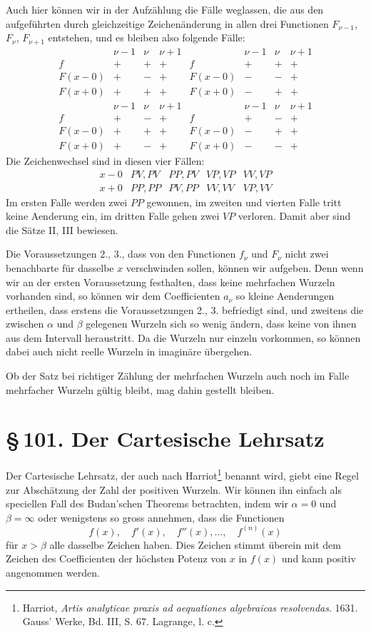 \documentclass[11pt]{article}
\providecommand{\sect}[2]{\section*{\S\,#1. #2}}
\begin{document}
Auch hier können wir in der Aufzählung die Fälle weglassen, die aus den aufgeführten durch gleichzeitige Zeichenänderung in allen drei Functionen $F_{\nu-1}$, $F_\nu$, $F_{\nu+1}$ entstehen, und es bleiben also folgende Fälle:
\[
\begin{array}{c|ccc||c|ccc}
 &\nu-1&\nu&\nu+1& &\nu-1&\nu&\nu+1\\ \hline
f&+&+&+&f&+&+&+\\
F(x-0)&+&-&+&F(x-0)&-&-&+\\
F(x+0)&+&+&+&F(x+0)&-&+&+
\end{array}
\]
\[
\begin{array}{c|ccc||c|ccc}
 &\nu-1&\nu&\nu+1& &\nu-1&\nu&\nu+1\\ \hline
f&+&-&+&f&+&-&+\\
F(x-0)&+&+&+&F(x-0)&-&+&+\\
F(x+0)&+&-&+&F(x+0)&-&-&+
\end{array}
\]
Die Zeichenwechsel sind in diesen vier Fällen:
\[
\begin{array}{c|cccc}
x-0&PV,PV&PP,PV&VP,VP&VV,VP\\
x+0&PP,PP&PV,PP&VV,VV&VP,VV
\end{array}
\]
Im ersten Falle werden zwei $PP$ gewonnen, im zweiten und vierten Falle tritt keine Aenderung ein, im dritten Falle gehen zwei $VP$ verloren. Damit aber sind die Sätze II, III bewiesen.

Die Voraussetzungen 2., 3., dass von den Functionen $f_\nu$ und $F_\nu$ nicht zwei benachbarte für dasselbe $x$ verschwinden sollen, können wir aufgeben. Denn wenn wir an der ersten Voraussetzung festhalten, dass keine mehrfachen Wurzeln vorhanden sind, so können wir dem Coefficienten $a_\nu$ so kleine Aenderungen ertheilen, dass erstens die Voraussetzungen 2., 3. befriedigt sind, und zweitens die zwischen $\alpha$ und $\beta$ gelegenen Wurzeln sich so wenig ändern, dass keine von ihnen aus dem Intervall heraustritt. Da die Wurzeln nur einzeln vorkommen, so können dabei auch nicht reelle Wurzeln in imaginäre übergehen.

Ob der Satz bei richtiger Zählung der mehrfachen Wurzeln auch noch im Falle mehrfacher Wurzeln gültig bleibt, mag dahin gestellt bleiben.

\sect{101}{Der Cartesische Lehrsatz}

Der Cartesische Lehrsatz, der auch nach Harriot\footnote{Harriot, \emph{Artis analyticae praxis ad aequationes algebraicas resolvendas}. 1631. Gauss' Werke, Bd. III, S. 67. Lagrange, l. c.} benannt wird, giebt eine Regel zur Abschätzung der Zahl der positiven Wurzeln. Wir können ihn einfach als speciellen Fall des Budan'schen Theorems betrachten, indem wir $\alpha=0$ und $\beta=\infty$ oder wenigstens so gross annehmen, dass die Functionen
\begin{equation}
        f(x),\quad f'(x),\quad f''(x),\ldots,\quad f^{(n)}(x)
\tag{1}
\end{equation}
für $x>\beta$ alle dasselbe Zeichen haben. Dies Zeichen stimmt überein mit dem Zeichen des Coefficienten der höchsten Potenz von $x$ in $f(x)$ und kann positiv angenommen werden.
\end{document}
